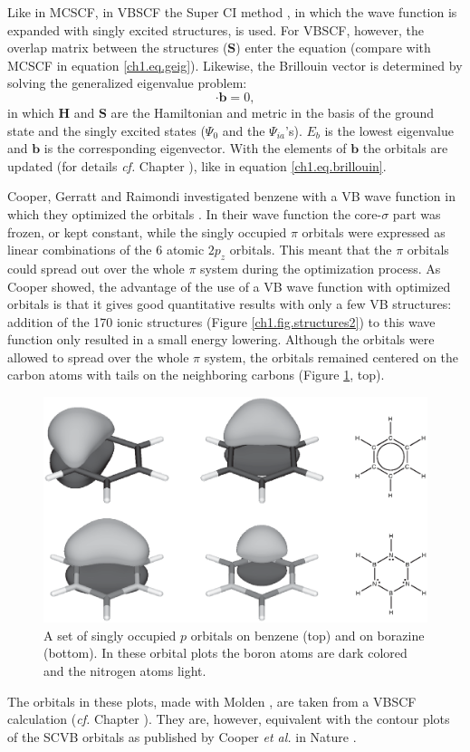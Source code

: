 Like in MCSCF, in VBSCF the Super CI method \cite{superci1,superci2}, in which the wave function is expanded with singly excited structures, is used. For VBSCF, however, the overlap matrix between the structures ($\mathbf{S}$) enter the equation (compare with MCSCF in equation \ref{ch1.eq.geig}). Likewise, the  Brillouin vector is determined by solving the generalized eigenvalue problem:
\begin{equation}
[\mathbf{H}-E_b\mathbf{S}] \cdot \mathbf{b} = 0,
\label{ch1.eq.geigvb}
\end{equation}
in which $\mathbf{H}$ and $\mathbf{S}$ are the Hamiltonian and metric in the basis of the ground state and the singly excited states ($\Psi_0$ and the $\Psi_{ia}$'s). $E_b$ is the lowest eigenvalue and $\mathbf{b}$ is the corresponding eigenvector. With the elements of $\mathbf{b}$ the orbitals are updated (for details  \textit{cf.} Chapter \chorbopt), like in equation \ref{ch1.eq.brillouin}.

Cooper, Gerratt and Raimondi investigated benzene with a VB wave function in which they optimized the orbitals \cite{nature}. In their wave function the core-$\sigma$ part was frozen, or kept constant, while the singly occupied $\pi$ orbitals were expressed as linear combinations of the 6 atomic $2p_z$ orbitals. This meant that the $\pi$ orbitals could spread out over the whole $\pi$ system during the optimization process. As Cooper showed, the advantage of the use of a VB wave function with optimized orbitals is that it gives good quantitative results with only a few VB structures: addition of the 170 ionic structures (Figure \ref{ch1.fig.structures2}) to this wave function only resulted in a small energy lowering. Although the orbitals were allowed to spread over the whole $\pi$ system, the orbitals remained centered on the carbon atoms with tails on the neighboring carbons (Figure \ref{ch1.fig6}, top). 
\begin{figure}[htbp]
\center
\includegraphics[scale=0.5]{introduction/figures/figure6.eps}
\caption{A set of singly occupied $p$ orbitals on benzene (top) and on borazine (bottom). In these orbital plots the boron atoms are dark colored and the nitrogen atoms light.}
\label{ch1.fig6}
\end{figure}
The orbitals in these plots, made with Molden \cite{molden}, are taken from a VBSCF calculation (\textit{cf.} Chapter \chinorganic). They are, however, equivalent with the contour plots of the SCVB orbitals as published by Cooper \textit{et al.} in Nature \cite{nature}.


